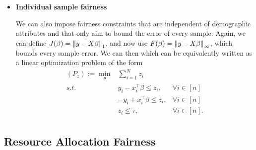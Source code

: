 \documentclass{article}
\begin{document}
\begin{itemize}
\begin{itemize}
\begin{figure}[h!]
\end{figure}

We can see that after the different errors meet, we quickly get an infeasible problem (unlike in the pairwise approach, where we could keep going). The behaviors are similar, but less smooth and with a very constrained interval of $\tau$ in order to get proper results. Although it is easier to visualize the slope of the tradeoff in this case. In this example, we get better overall results in the tradeoff, since the majority group maintains a lower MSE while the other two groups start to meet, while in the previous apporach they are all squeezed together.
\end{itemize}

\item \textbf{Individual sample fairness}

We can also impose fairness constraints that are independent of demographic attributes and that only aim to bound the error of every sample. Again, we can define $J(\beta)=\norm[1]{y-X\beta}$, and now use $F(\beta)=\norm[\infty]{y-X\beta}$, which bounds every sample error. We can then 
which can be equivalently written as a linear optimization problem of the form
\[
\begin{array}{rcc}
\displaystyle
   (P_z):= \min_{\theta} &  \sum_{i=1}^N z_i  &\\
     s.t. & y_i - x_i^{\top}\beta \leq z_i, & \forall i \in [n]\\
     & -y_i + x_i^{\top}\beta \leq z_i, & \forall i \in [n]\\
    & z_i \leq \tau, & \forall i \in [n].\\
\end{array}
\]
\end{itemize}


\subsection{Resource Allocation Fairness}
\end{document}
